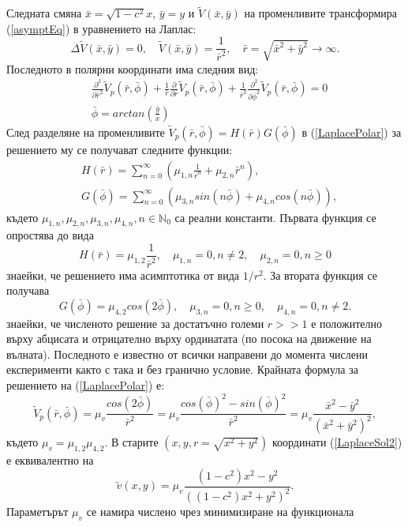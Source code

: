 \documentclass[a4paper]{article}
\newcommand{\be}{\begin{equation}}
\newcommand{\ee}{\end{equation}}
\newcommand{\rf}[1]{(\ref{#1})}
\theoremstyle{remark}
\begin{document}
Следната смяна $\bar x  = \sqrt{1-c^2} x$, $\bar y = y$ и $\tilde V (\bar x, \bar y)$ на променливите трансформира \rf{asymptEq} в уравнението на Лаплас:
\be\label{LaplaceEq}
\Delta \tilde V(\bar x, \bar y) = 0, \quad \tilde V(\bar x, \bar y) = \frac{1}{\bar r^2}, \quad \bar r = \sqrt{\bar x^2 + \bar y^2} \rightarrow \infty.
\ee
Последното в полярни координати има следния вид:
\begin{align}\label{LaplacePolar}
&\frac{\partial^2}{\partial \bar r^2} \tilde V_p(\bar r,\bar \phi) + \frac{1}{\bar r} \frac{\partial}{\partial \bar r} \tilde V_p(\bar r, \bar \phi) + \frac{1}{\bar r^2} \frac{\partial^2}{\partial \bar \phi^2} \tilde V_p(\bar r, \bar \phi) = 0 \\
&\bar \phi = arctan(\frac{\bar y}{\bar x}) \nonumber
\end{align}
След разделяне на променливите $\tilde V_p(\bar r, \bar \phi) = H(\bar r) G(\bar \phi)$ в \rf{LaplacePolar} за решението му се получават следните функции:
\begin{align}\label{LaplaceSol}
&H(\bar{r}) = \sum^{\infty}_{n=0} (\mu_{1,n} \frac{1}{ \bar{r}^n} + \mu_{2,n} \bar{r}^n ),
\\ \nonumber &G(\bar \phi) = \sum^{\infty}_{n=0} (\mu_{3,n}sin(n \bar \phi ) + \mu_{4,n}cos(n \bar \phi)),
\end{align}
където $\mu_{1,n}, \mu_{2,n}, \mu_{3,n}, \mu_{4,n}, n \in \mathbb{N}_{0}$ са реални константи. Първата функция се опростява до вида
\be
H(\bar r) = \mu_{1,2}\frac{1}{\bar r^2}, \quad \mu_{1,n} = 0, n \neq 2, \quad \mu_{2,n} = 0, n \ge 0
\ee
знаейки, че решението има асимптотика от вида $1/r^2$. За втората функция се получава
\be
G(\bar \phi) = \mu_{4,2}cos(2 \bar \phi), \quad \mu_{3,n} = 0, n \ge 0, \quad \mu_{4,n} = 0, n \neq 2.
\ee
знаейки, че численото решение за достатъчно големи $r >> 1$ е положително върху абцисата и отрицателно върху ординатата (по посока на движение на вълната). Последното е известно от всички направени до момента числени експерименти както с така и без гранично условие. Крайната формула за решението на \rf{LaplacePolar} е:
\be \label{LaplaceSol2}
\tilde V_p(\bar r, \bar \phi) = \mu_v \frac{ cos(2 \bar \phi) }{ \bar r^2 } = \mu_v \frac{ cos(\bar \phi)^2 - sin(\bar \phi)^2 }{ \bar r^2 } = \mu_v \frac{ \bar x^2 - \bar y^2 }{ (\bar x^2 + \bar y^2)^2 },
\ee
където $\mu_v = \mu_{1,2} \mu_{4,2}$. В старите $(x, y, r=\sqrt{x^2+y^2})$ координати \rf{LaplaceSol2} е еквивалентно на 
\be\label{bndv}
\tilde v(x, y) = \mu_v \frac{ (1-c^2) x^2 - y^2 }{ ((1-c^2) x^2 + y^2)^2 }.
\ee
Параметърът $\mu_v$ се намира числено чрез минимизиране на функционала
\end{document}
